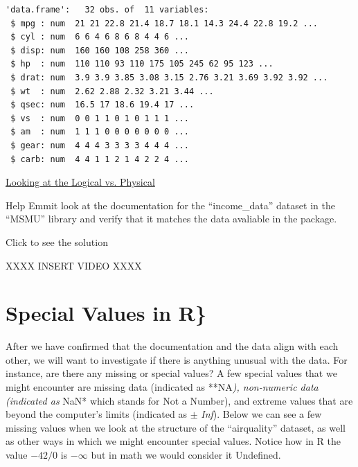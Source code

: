 \documentclass[
  letterpaper,
  DIV=11,
  numbers=noendperiod]{scrreprt}
\begin{document}
\begin{verbatim}
'data.frame':   32 obs. of  11 variables:
 $ mpg : num  21 21 22.8 21.4 18.7 18.1 14.3 24.4 22.8 19.2 ...
 $ cyl : num  6 6 4 6 8 6 8 4 4 6 ...
 $ disp: num  160 160 108 258 360 ...
 $ hp  : num  110 110 93 110 175 105 245 62 95 123 ...
 $ drat: num  3.9 3.9 3.85 3.08 3.15 2.76 3.21 3.69 3.92 3.92 ...
 $ wt  : num  2.62 2.88 2.32 3.21 3.44 ...
 $ qsec: num  16.5 17 18.6 19.4 17 ...
 $ vs  : num  0 0 1 1 0 1 0 1 1 1 ...
 $ am  : num  1 1 1 0 0 0 0 0 0 0 ...
 $ gear: num  4 4 4 3 3 3 3 4 4 4 ...
 $ carb: num  4 4 1 1 2 1 4 2 2 4 ...
\end{verbatim}

\begin{watch}{}{}
    \href{https://youtu.be/e70L-Zy__0I}{Looking at the Logical vs. Physical}
\end{watch}

\begin{tcolorbox}[enhanced jigsaw, colframe=quarto-callout-tip-color-frame, colback=white, breakable, rightrule=.15mm, title=\textcolor{quarto-callout-tip-color}{\faLightbulb}\hspace{0.5em}{Try it Out}, bottomtitle=1mm, toptitle=1mm, titlerule=0mm, left=2mm, coltitle=black, colbacktitle=quarto-callout-tip-color!10!white, leftrule=.75mm, opacitybacktitle=0.6, bottomrule=.15mm, opacityback=0, arc=.35mm, toprule=.15mm]

Help Emmit look at the documentation for the ``income\_data'' dataset in
the ``MSMU'' library and verify that it matches the data avaliable in
the package.

Click to see the solution

XXXX INSERT VIDEO XXXX

\end{tcolorbox}

\section{Special Values in R\}}\label{special-values-in-r}

After we have confirmed that the documentation and the data align with
each other, we will want to investigate if there is anything unusual
with the data. For instance, are there any missing or special values? A
few special values that we might encounter are missing data (indicated
as **NA\emph{), non-numeric data (indicated as }NaN* which stands for
Not a Number), and extreme values that are beyond the computer's limits
(indicated as \(\pm\) \emph{Inf}). Below we can see a few missing values
when we look at the structure of the ``airquality'' dataset, as well as
other ways in which we might encounter special values. Notice how in R
the value \(-42/0\) is \(-\infty\) but in math we would consider it
Undefined.
\end{document}
